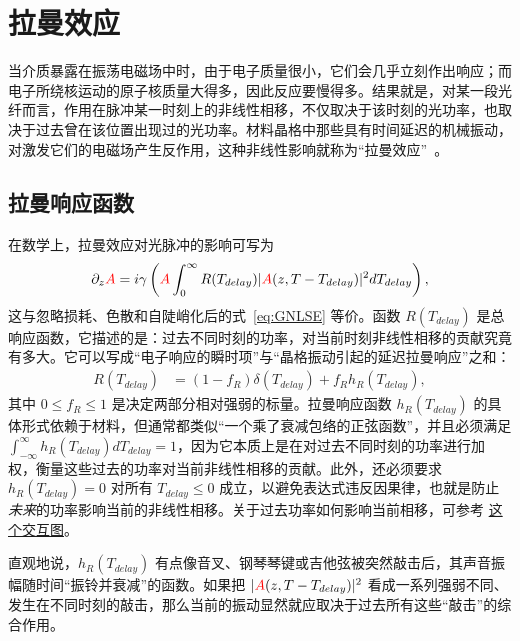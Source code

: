 \chapter{拉曼效应}
\label{ch:Raman}

当介质暴露在振荡电磁场中时，由于电子质量很小，它们会几乎立刻作出响应；而电子所绕核运动的原子核质量大得多，因此反应要慢得多。结果就是，对某一段光纤而言，作用在脉冲某一时刻上的非线性相移，不仅取决于该时刻的光功率，也取决于过去曾在该位置出现过的光功率。材料晶格中那些具有时间延迟的机械振动，对激发它们的电磁场产生反作用，这种非线性影响就称为“拉曼效应”~\cite{Raman_original}。



\section{拉曼响应函数}
在数学上，拉曼效应对光脉冲的影响可写为
\begin{align}
\label{eq:raman}
 \partial_z \textcolor{red}{A} = i\gamma\left(
\textcolor{red}{A} \int_{0}^{\infty} R(T_{delay})|\textcolor{red}{A}(z,T-T_{delay})|^2 dT_{delay} \right),
\end{align}
这与忽略损耗、色散和自陡峭化后的式~\ref{eq:GNLSE} 等价。函数 $R(T_{delay})$ 是总响应函数，它描述的是：过去不同时刻的功率，对当前时刻非线性相移的贡献究竟有多大。它可以写成“电子响应的瞬时项”与“晶格振动引起的延迟拉曼响应”之和：
\begin{align}
    \label{eq:response}
    R(T_{delay})&= (1-f_R)\delta(T_{delay})+f_Rh_R(T_{delay}),
\end{align}
其中 $0\leq f_R\leq 1$ 是决定两部分相对强弱的标量。拉曼响应函数 $h_R(T_{delay})$ 的具体形式依赖于材料，但通常都类似“一个乘了衰减包络的正弦函数”，并且必须满足 $\int_{-\infty}^{\infty}h_R(T_{delay}) dT_{delay}=1$，因为它本质上是在对过去不同时刻的功率进行加权，衡量这些过去的功率对当前非线性相移的贡献。此外，还必须要求 $h_R(T_{delay})=0$ 对所有 $T_{delay}\leq0$ 成立，以避免表达式违反因果律，也就是防止\emph{未来}的功率影响当前的非线性相移。关于过去功率如何影响当前相移，可参考 \href{https://www.desmos.com/calculator/bdg6icprch}{这个交互图}。

直观地说，$h_R(T_{delay})$ 有点像音叉、钢琴琴键或吉他弦被突然敲击后，其声音振幅随时间“振铃并衰减”的函数。如果把 $|\textcolor{red}{A}(z,T-T_{delay})|^2$ 看成一系列强弱不同、发生在不同时刻的敲击，那么当前的振动显然就应取决于过去所有这些“敲击”的综合作用。

